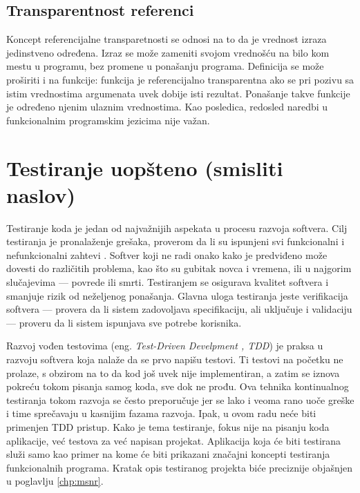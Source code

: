 \documentclass[12pt,oneside]{memoir}
\begin{document}
\subsection{Transparentnost referenci}
Koncept referencijalne transparetnosti se odnosi na to da je vrednost izraza jedinstveno određena. Izraz se može zameniti svojom vrednošću na bilo kom mestu u programu, bez promene u ponašanju programa. Definicija se može proširiti i na funkcije: funkcija je referencijalno transparentna ako se pri pozivu sa istim vrednostima argumenata uvek dobije isti rezultat. Ponašanje takve funkcije je određeno njenim ulaznim vrednostima. Kao posledica, redosled naredbi u funkcionalnim programskim jezicima nije važan.

\section{Testiranje uopšteno (smisliti naslov)}
\label{sec:piramid}

\par Testiranje koda je jedan od najvažnijih aspekata u procesu razvoja softvera. Cilj testiranja je pronalaženje grešaka, proverom da li su ispunjeni svi funkcionalni i nefunkcionalni zahtevi \cite{test}.  Softver koji ne radi onako kako je predviđeno može dovesti do različitih problema, kao što su gubitak novca i vremena, ili u najgorim slučajevima --- povrede ili smrti. Testiranjem se osigurava kvalitet softvera i smanjuje rizik od neželjenog ponašanja. Glavna uloga testiranja jeste verifikacija softvera --- provera da li sistem zadovoljava specifikaciju, ali uključuje i validaciju --- proveru da li sistem ispunjava sve potrebe korisnika.  
\par Razvoj vođen testovima (eng. \emph{Test-Driven Develpment , TDD}) je praksa u razvoju softvera koja nalaže da se prvo napišu testovi. Ti testovi na početku ne prolaze, s obzirom na to da kod još uvek nije implementiran, a zatim se iznova pokreću tokom pisanja samog koda, sve dok ne prođu. Ova tehnika kontinualnog testiranja tokom razvoja se često preporučuje jer se lako i veoma rano uoče greške i time sprečavaju u kasnijim fazama razvoja. Ipak, u ovom radu neće biti primenjen TDD pristup. Kako je tema testiranje, fokus nije na pisanju koda aplikacije, već testova za već napisan projekat. Aplikacija koja će biti testirana služi samo kao primer na kome će biti prikazani značajni koncepti testiranja funkcionalnih programa. Kratak opis testiranog projekta biće preciznije objašnjen u poglavlju \ref{chp:msnr}. 
\end{document}
